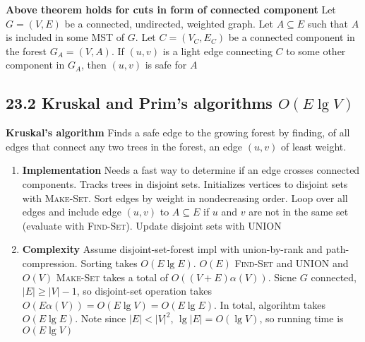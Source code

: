 \documentclass[11pt]{article}
\begin{document}
\begin{corollary*}
    \textbf{Above theorem holds for cuts in form of connected component} Let $G =(V,E)$ be a connected, undirected, weighted graph. Let $A\subseteq E$ such that $A$ is included in some MST of $G$. Let $C = (V_C, E_C)$ be a connected component in the forest $G_A = (V,A)$. If $(u,v)$ is a light edge connecting $C$ to some other component in $G_A$, then $(u,v)$ is safe for $A$
\end{corollary*}


\subsection*{23.2 Kruskal and Prim's algorithms $O(E\lg V)$}


\begin{defn*}
    \textbf{Kruskal's algorithm} Finds a safe edge to the growing forest by finding, of all edges that connect any two trees in the forest, an edge $(u,v)$ of least weight.
    \begin{enumerate}
        \item \textbf{Implementation} Needs a fast way to determine if an edge crosses connected components. Tracks trees in disjoint sets. Initializes vertices to disjoint sets with \textsc{Make-Set}. Sort edges by weight in nondecreasing order. Loop over all edges and include edge $(u,v)$ to $A\subseteq E$ if $u$ and $v$ are not in the same set (evaluate with \textsc{Find-Set}). Update disjoint sets with \textsc{UNION}
        \item \textbf{Complexity} Assume disjoint-set-forest impl with union-by-rank and path-compression. Sorting takes $O(E\lg E)$. $O(E)$ \textsc{Find-Set} and \textsc{UNION} and $O(V)$ \textsc{Make-Set} takes a total of $O((V+E)\alpha(V))$. Sicne $G$ connected, $|E| \geq |V| - 1$, so disjoint-set operation takes $O(E\alpha(V)) = O(E\lg V) = O(E\lg E)$. In total, algorihtm takes $O(E\lg E)$. Note since $|E| < |V|^2$, $\lg |E| = O(\lg V)$, so running time is $O(E\lg V)$
    \end{enumerate}
\end{defn*}
\end{document}
